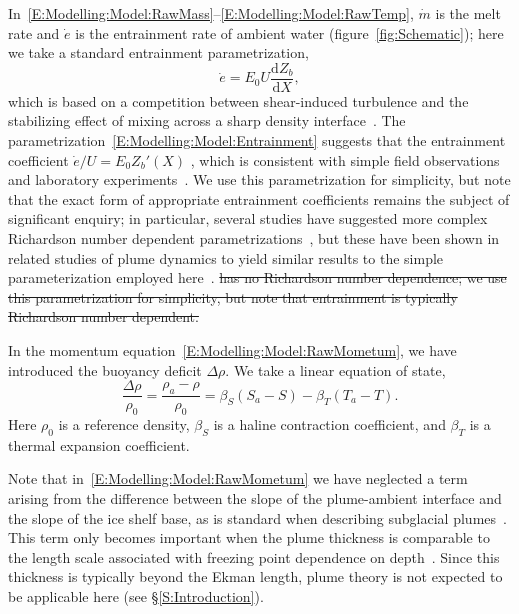\documentclass[openacc]{rsproca_new}%
\newcommand{\dd}[2]{\frac{\mathrm{d} #1}{\mathrm{d} #2}}
\newcommand{\red}[1]{{\color{red} #1}}
\newcommand{\blue}[1]{{\color{blue} #1}}
\newcommand{\rout}[1]{\red{\st{#1}}}\newcommand{\ab}[1]{\textcolor{Green}{#1}}\newcommand{\about}[1]{\textcolor{Cyan}{\sout{#1}}}
\begin{document}
In~\eqref{E:Modelling:Model:RawMass}--\eqref{E:Modelling:Model:RawTemp}, $\dot{m}$ is the melt rate and $\dot{e}$ is the entrainment rate of ambient water (figure~\ref{fig:Schematic}); here we take a standard entrainment parametrization, 
\begin{equation}\label{E:Modelling:Model:Entrainment}
\dot{e} = E_0 U \dd{Z_b}{X},
\end{equation}
which is based on a competition between shear-induced turbulence and the stabilizing effect of mixing across a sharp density interface~\cite{Pedersen1980,Turner1986JFM}. The parametrization~\eqref{E:Modelling:Model:Entrainment} suggests that the entrainment coefficient $\dot{e}/U = E_0 Z_b'(X)$\blue{, which is consistent with simple field observations~\cite{Pedersen1980} and laboratory experiments~\cite{Wells2005GAF}. We use this parametrization for simplicity, but note that the exact form of appropriate entrainment coefficients remains the subject of significant enquiry; in particular, several studies have suggested more complex Richardson number dependent parametrizations~\cite[e.g.][]{Holland2007JGeophysResOceans}, but these have been shown in related studies of plume dynamics to yield similar results to the simple parameterization employed here}~\cite{Magorrian2016JGeoResOcean}.\rout{has no Richardson number dependence; we use this parametrization for simplicity, but note that entrainment is typically Richardson number dependent.}

In the momentum equation~\eqref{E:Modelling:Model:RawMometum}, we have introduced the buoyancy deficit $\Delta \rho$. We take a linear equation of state,
\begin{equation}\label{E:Modelling:Model:EquationOfState}
\frac{\Delta \rho}{\rho_0}  = \frac{\rho_a - \rho}{\rho_0}= \beta_S(S_a - S) - \beta_T (T_a - T).
\end{equation}
Here $\rho_0$ is a reference density, $\beta_S$ is a haline contraction coefficient, and $\beta_T$ is a thermal expansion coefficient. 

Note that in~\eqref{E:Modelling:Model:RawMometum} we have neglected a term arising from the difference between the slope of the plume-ambient interface and the slope of the ice shelf base, as is standard when describing subglacial plumes~\cite{Hewitt2020AnnRevFlu}. This term only becomes important when the plume thickness is comparable to the length scale associated with freezing point dependence on depth~\cite{Jenkins2011JPhysOcean}. Since this thickness is typically beyond the Ekman length, plume theory is not expected to be applicable here (see \S\ref{S:Introduction}).
\end{document}
